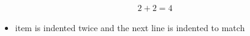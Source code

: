 \documentclass{minimal}
\begin{document}
\begin{align}
  2+2=4
\end{align}

\begin{itemize}
  \item item is indented twice
    and the next line is indented to match
\end{itemize}
\end{document}
